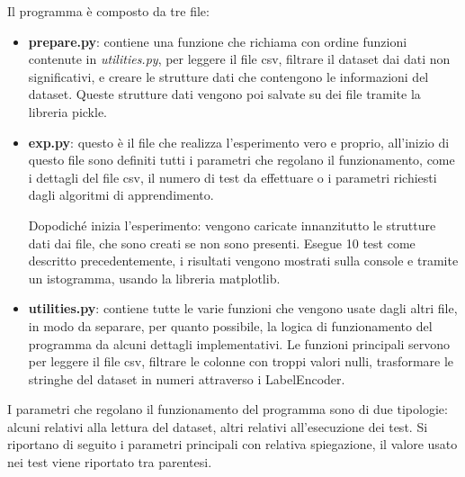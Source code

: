 \documentclass[]{article}
\begin{document}
Il programma è composto da tre file:
\begin{itemize}
\item \textbf{prepare.py}: contiene una funzione che richiama con ordine funzioni contenute in \textit{utilities.py}, per leggere il file csv, filtrare il dataset dai dati non significativi, e creare le strutture dati che contengono le informazioni del dataset. Queste strutture dati vengono poi salvate su dei file tramite la libreria pickle.

\item \textbf{exp.py}: questo è il file che realizza l'esperimento vero e proprio, all'inizio di questo file sono definiti tutti i parametri che regolano il funzionamento, come i dettagli del file csv, il numero di test da effettuare o i parametri richiesti dagli algoritmi di apprendimento.

Dopodiché inizia l'esperimento: vengono caricate innanzitutto le strutture dati dai file, che sono creati se non sono presenti. Esegue 10 test come descritto precedentemente, i risultati vengono mostrati sulla console e tramite un istogramma, usando la libreria matplotlib.

\item \textbf{utilities.py}: contiene tutte le varie funzioni che vengono usate dagli altri file, in modo da separare, per quanto possibile, la logica di funzionamento del programma da alcuni dettagli implementativi. Le funzioni principali servono per leggere il file csv, filtrare le colonne con troppi valori nulli, trasformare le stringhe del dataset in numeri attraverso i LabelEncoder.
\end{itemize}

I parametri che regolano il funzionamento del programma sono di due tipologie: alcuni relativi alla lettura del dataset, altri relativi all'esecuzione dei test. Si riportano di seguito i parametri principali con relativa spiegazione, il valore usato nei test viene riportato tra parentesi.
\end{document}

